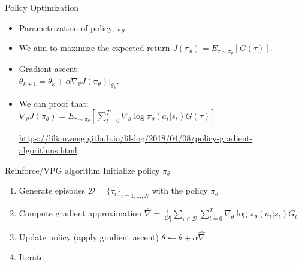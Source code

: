\documentclass{beamer}
\begin{document}
\begin{frame}{Policy Optimization}
    \begin{itemize}
 \item Parametrization of policy, $\pi_{\theta}$.
 \item We aim to maximize the expected return $J(\pi_{\theta}) = E_{\tau \sim \pi_{\theta}}[{G(\tau)}]$.\\

 \item Gradient ascent:\\
$\theta_{k+1} = \theta_k + \alpha \left. \nabla_{\theta} J(\pi_{\theta}) \right|_{\theta_k}$.

 \item We can proof  that:\\
$\nabla_{\theta} J(\pi_{\theta}) = E_{\tau \sim \pi_{\theta}}[{\sum_{t=0}^{T} \nabla_{\theta} \log \pi_{\theta}(a_t |s_t) G(\tau)}]$ 


\url{https://lilianweng.github.io/lil-log/2018/04/08/policy-gradient-algorithms.html}

\end{itemize}
\end{frame}
\begin{frame}{Reinforce/VPG algorithm}
Initialize policy $\pi_{\theta}$
\begin{enumerate}
    \item Generate episodes $\mathcal{D} = \{\tau_i\}_{i=1,...,N}$ with the policy $\pi_\theta$
     \item Compute gradient approximation $\hat{\nabla} = \frac{1}{|\mathcal{D}|} \sum_{\tau \in \mathcal{D}} \sum_{t=0}^{T} \nabla_{\theta} \log \pi_{\theta}(a_t |s_t) G_t$
    \item Update policy (apply gradient ascent) $\theta \leftarrow \theta + \alpha \hat{\nabla}$ 
    \item Iterate
\end{enumerate}
\end{frame}
\end{document}
